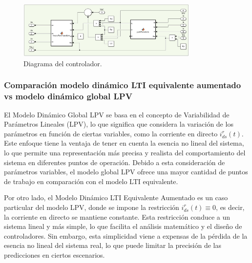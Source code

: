 \documentclass{article}
\begin{document}
\begin{enumerate}[label=\roman*.]
    \begin{figure}[H]
        \centering
        \includegraphics[width=0.8\textwidth]{LTI_AUMENTADO_Q_CONTROLADOR.jpg}
        \caption{Diagrama del controlador.}
    \end{figure}


\end{enumerate}


\subsubsection{Comparación modelo dinámico LTI equivalente aumentado vs modelo dinámico global LPV}

El Modelo Dinámico Global LPV se basa en el concepto de Variabilidad de Parámetros Lineales (LPV), 
lo que significa que considera la variación de los parámetros en función de ciertas variables, como 
la corriente en directo $i^r_{ds}(t)$. Este enfoque tiene la ventaja de tener en cuenta la esencia no 
lineal del sistema, lo que permite una representación más precisa y realista del comportamiento del 
sistema en diferentes puntos de operación. Debido a esta consideración de parámetros variables, el 
modelo global LPV ofrece una mayor cantidad de puntos de trabajo en comparación con el modelo LTI 
equivalente.

Por otro lado, el Modelo Dinámico LTI Equivalente Aumentado es un caso particular del modelo LPV, 
donde se impone la restricción $i^r_{ds}(t) \equiv 0$, es decir, la corriente en directo se mantiene 
constante. Esta restricción conduce a un sistema lineal y más simple, lo que facilita el análisis 
matemático y el diseño de controladores. Sin embargo, esta simplicidad viene a expensas de la pérdida 
de la esencia no lineal del sistema real, lo que puede limitar la precisión de las predicciones en 
ciertos escenarios.
\end{document}
